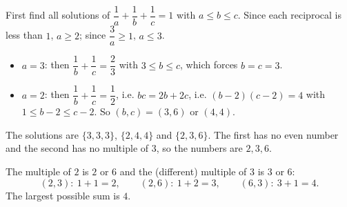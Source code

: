 First find all solutions of $\dfrac1a+\dfrac1b+\dfrac1c=1$ with $a\le b\le c$. Since each reciprocal is less than $1$, $a\ge2$; since $\dfrac3a\ge1$, $a\le3$.
\begin{itemize}
\item $a=3$: then $\dfrac1b+\dfrac1c=\dfrac23$ with $3\le b\le c$, which forces $b=c=3$.
\item $a=2$: then $\dfrac1b+\dfrac1c=\dfrac12$, i.e. $bc=2b+2c$, i.e. $(b-2)(c-2)=4$ with $1\le b-2\le c-2$. So $(b,c)=(3,6)$ or $(4,4)$.
\end{itemize}
The solutions are $\{3,3,3\}$, $\{2,4,4\}$ and $\{2,3,6\}$. The first has no even number and the second has no multiple of $3$, so the numbers are $2,3,6$.

The multiple of $2$ is $2$ or $6$ and the (different) multiple of $3$ is $3$ or $6$:
\[(2,3):\ 1+1=2,\qquad (2,6):\ 1+2=3,\qquad (6,3):\ 3+1=4.\]
The largest possible sum is $\boxed{4}$.

